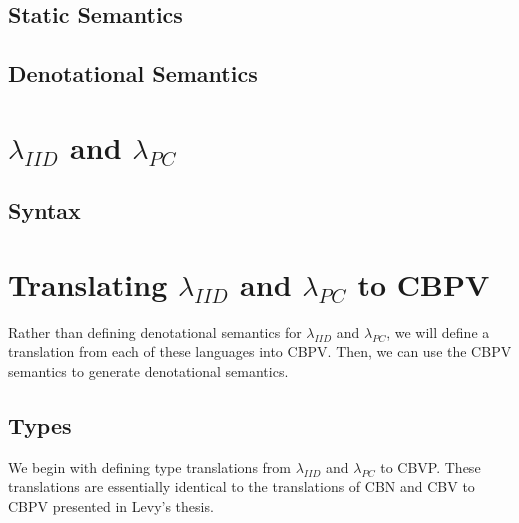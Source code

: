 \documentclass{article}
\DeclareMathOperator*\R{\mathbb{R}}
\newcommand{\rand}{\mathsf{rand}}
\begin{document}
\subsection{Static Semantics}
	\inferrule{ }{\Gamma \vdash^c \rand : F \R}

\subsection{Denotational Semantics}

\section{$\lambda_{IID}$ and $\lambda_{PC}$}

\subsection{Syntax}

\section{Translating $\lambda_{IID}$ and $\lambda_{PC}$ to CBPV}
Rather than defining denotational semantics for $\lambda_{IID}$ and $\lambda_{PC}$,
we will define a translation from each of these languages into CBPV.
Then, we can use the CBPV semantics to generate denotational semantics.

\subsection{Types}
We begin with defining type translations from $\lambda_{IID}$ and $\lambda_{PC}$ to CBVP.
These translations are essentially identical to the translations of CBN and CBV to CBPV presented in Levy's thesis.
\end{document}
